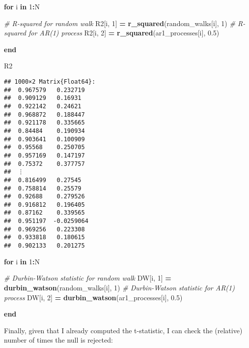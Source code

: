 \documentclass[
]{article}
\newenvironment{Shaded}{\begin{snugshade}}{\end{snugshade}}
\newcommand{\CommentTok}[1]{\textcolor[rgb]{0.56,0.35,0.01}{\textit{#1}}}
\newcommand{\ControlFlowTok}[1]{\textcolor[rgb]{0.13,0.29,0.53}{\textbf{#1}}}
\newcommand{\FloatTok}[1]{\textcolor[rgb]{0.00,0.00,0.81}{#1}}
\newcommand{\FunctionTok}[1]{\textcolor[rgb]{0.13,0.29,0.53}{\textbf{#1}}}
\newcommand{\KeywordTok}[1]{\textcolor[rgb]{0.13,0.29,0.53}{\textbf{#1}}}
\newcommand{\NormalTok}[1]{#1}
\newcommand{\OperatorTok}[1]{\textcolor[rgb]{0.81,0.36,0.00}{\textbf{#1}}}
\begin{document}
\begin{Shaded}
\begin{Highlighting}[]
\ControlFlowTok{for}\NormalTok{ i }\KeywordTok{in} \FloatTok{1}\OperatorTok{:}\NormalTok{N}
    
    \CommentTok{\# R{-}squared for random walk}
\NormalTok{    R2[i, }\FloatTok{1}\NormalTok{] }\OperatorTok{=} \FunctionTok{r\_squared}\NormalTok{(random\_walks[i], }\FloatTok{1}\NormalTok{)}
    \CommentTok{\# R{-}squared for AR(1) process}
\NormalTok{    R2[i, }\FloatTok{2}\NormalTok{] }\OperatorTok{=} \FunctionTok{r\_squared}\NormalTok{(ar1\_processes[i], }\FloatTok{0.5}\NormalTok{)}
    
\ControlFlowTok{end}

\NormalTok{R2}
\end{Highlighting}
\end{Shaded}

\begin{verbatim}
## 1000×2 Matrix{Float64}:
##  0.967579   0.232719
##  0.909129   0.16931
##  0.922142   0.24621
##  0.968872   0.188447
##  0.921178   0.335665
##  0.84484    0.190934
##  0.903641   0.100909
##  0.95568    0.250705
##  0.957169   0.147197
##  0.75372    0.377757
##  ⋮         
##  0.816499   0.27545
##  0.758814   0.25579
##  0.92688    0.279526
##  0.916812   0.196405
##  0.87162    0.339565
##  0.951197  -0.0259064
##  0.969256   0.223308
##  0.933818   0.180615
##  0.902133   0.201275
\end{verbatim}

\begin{Shaded}
\begin{Highlighting}[]
\ControlFlowTok{for}\NormalTok{ i }\KeywordTok{in} \FloatTok{1}\OperatorTok{:}\NormalTok{N}

    \CommentTok{\# Durbin{-}Watson statistic for random walk}
\NormalTok{    DW[i, }\FloatTok{1}\NormalTok{] }\OperatorTok{=} \FunctionTok{durbin\_watson}\NormalTok{(random\_walks[i], }\FloatTok{1}\NormalTok{)}
    \CommentTok{\# Durbin{-}Watson statistic for AR(1) process}
\NormalTok{    DW[i, }\FloatTok{2}\NormalTok{] }\OperatorTok{=} \FunctionTok{durbin\_watson}\NormalTok{(ar1\_processes[i], }\FloatTok{0.5}\NormalTok{)}
    
\ControlFlowTok{end}
\end{Highlighting}
\end{Shaded}

Finally, given that I already computed the t-statistic, I can check the
(relative) number of times the null is rejected:
\end{document}
